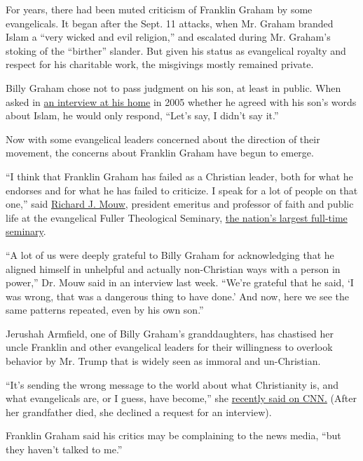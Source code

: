 For years, there had been muted criticism of Franklin Graham by some
evangelicals. It began after the Sept. 11 attacks, when Mr. Graham
branded Islam a ``very wicked and evil religion,'' and escalated during
Mr. Graham's stoking of the ``birther'' slander. But given his status as
evangelical royalty and respect for his charitable work, the misgivings
mostly remained private.

Billy Graham chose not to pass judgment on his son, at least in public.
When asked in
\href{https://www.nytimes3xbfgragh.onion/2005/06/12/us/spirit-willing-one-more-trip-down-mountain-for-graham.html}{an
interview at his home} in 2005 whether he agreed with his son's words
about Islam, he would only respond, ``Let's say, I didn't say it.''

Now with some evangelical leaders concerned about the direction of their
movement, the concerns about Franklin Graham have begun to emerge.

``I think that Franklin Graham has failed as a Christian leader, both
for what he endorses and for what he has failed to criticize. I speak
for a lot of people on that one,'' said
\href{https://fuller.edu/faculty/richard-j-mouw/}{Richard J. Mouw},
president emeritus and professor of faith and public life at the
evangelical Fuller Theological Seminary,
\href{https://juicyecumenism.com/2016/08/01/americas-largest-seminaries/}{the
nation's largest full-time seminary}.

``A lot of us were deeply grateful to Billy Graham for acknowledging
that he aligned himself in unhelpful and actually non-Christian ways
with a person in power,'' Dr. Mouw said in an interview last week.
``We're grateful that he said, `I was wrong, that was a dangerous thing
to have done.' And now, here we see the same patterns repeated, even by
his own son.''

Jerushah Armfield, one of Billy Graham's granddaughters, has chastised
her uncle Franklin and other evangelical leaders for their willingness
to overlook behavior by Mr. Trump that is widely seen as immoral and
un-Christian.

``It's sending the wrong message to the world about what Christianity
is, and what evangelicals are, or I guess, have become,'' she
\href{https://www.cnn.com/2018/01/26/us/jerushah-armfield-bill-graham-granddaughter-erin-burnett-outfront-jim-sciutto-cnntv/index.html}{recently
said on CNN.} (After her grandfather died, she declined a request for an
interview).

Franklin Graham said his critics may be complaining to the news media,
``but they haven't talked to me.''

